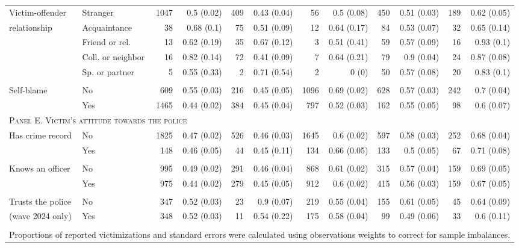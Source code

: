 \begin{tabular}{p{1.3in}p{1.1in}rrrrrrrrrr}
	 Victim-offender & Stranger & 1047 & 0.5 (0.02) & 409 & 0.43 (0.04) & 56 & 0.5 (0.08) & 450 & 0.51 (0.03) & 189 & 0.62 (0.05) \\ 
	 relationship & Acquaintance & 38 & 0.68 (0.1) & 75 & 0.51 (0.09) & 12 & 0.64 (0.17) & 84 & 0.53 (0.07) & 32 & 0.65 (0.14) \\ 
	 & Friend or rel. & 13 & 0.62 (0.19) & 35 & 0.67 (0.12) & 3 & 0.51 (0.41) & 59 & 0.57 (0.09) & 16 & 0.93 (0.1) \\ 
	 & Coll. or neighbor & 16 & 0.82 (0.14) & 72 & 0.41 (0.09) & 7 & 0.64 (0.21) & 79 & 0.9 (0.04) & 24 & 0.87 (0.08) \\ 
	 & Sp. or partner & 5 & 0.55 (0.33) & 2 & 0.71 (0.54) & 2 & 0 (0) & 50 & 0.57 (0.08) & 20 & 0.83 (0.1) \\ 
	 	 	\vspace{1pt}\\
	 Self-blame & No & 609 & 0.55 (0.03) & 216 & 0.45 (0.05) & 1096 & 0.69 (0.02) & 628 & 0.57 (0.03) & 242 & 0.7 (0.04) \\ 
	 & Yes & 1465 & 0.44 (0.02) & 384 & 0.45 (0.04) & 797 & 0.52 (0.03) & 162 & 0.55 (0.05) & 98 & 0.6 (0.07) \\ 
	 	 \midrule
		\multicolumn{12}{l}{\textsc{Panel E. Victim's attitude towards the police}} \\
Has crime record & No & 1825 & 0.47 (0.02) & 526 & 0.46 (0.03) & 1645 & 0.6 (0.02) & 597 & 0.58 (0.03) & 252 & 0.68 (0.04) \\ 
& Yes & 148 & 0.46 (0.05) & 44 & 0.45 (0.11) & 134 & 0.66 (0.05) & 133 & 0.5 (0.05) & 67 & 0.71 (0.08) \\ 

	\vspace{1pt}\\
	
Knows an officer & No & 995 & 0.49 (0.02) & 291 & 0.46 (0.04) & 868 & 0.61 (0.02) & 315 & 0.57 (0.04) & 159 & 0.69 (0.05) \\ 
& Yes & 975 & 0.44 (0.02) & 279 & 0.45 (0.05) & 912 & 0.6 (0.02) & 415 & 0.56 (0.03) & 159 & 0.67 (0.05) \\ 
	\vspace{1pt}\\
Trusts the police & No & 347 & 0.52 (0.03) & 23 & 0.9 (0.07) & 219 & 0.55 (0.04) & 155 & 0.61 (0.05) & 45 & 0.64 (0.09) \\ 
(wave 2024 only) & Yes & 348 & 0.52 (0.03) & 11 & 0.54 (0.22) & 175 & 0.58 (0.04) & 99 & 0.49 (0.06) & 33 & 0.6 (0.11) \\ 

	\bottomrule
	\vspace{1pt}\\
	\multicolumn{12}{l}{\small Proportions of reported victimizations and standard errors were calculated using observations weights to correct for sample imbalances.}
\end{tabular}
